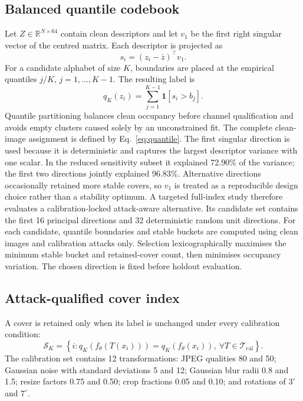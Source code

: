 ﻿\documentclass[a4paper,fleqn]{cas-dc}
\begin{document}
\subsection{Balanced quantile codebook}

Let $Z\in\mathbb{R}^{N\times64}$ contain clean descriptors and let $v_1$ be
the first right singular vector of the centred matrix. Each descriptor is
projected as
\begin{equation}
s_i=(z_i-\bar z)^\top v_1.
\end{equation}
For a candidate alphabet of size $K$, boundaries are placed at the empirical
quantiles $j/K$, $j=1,\ldots,K-1$. The resulting label is
\begin{equation}
q_K(z_i)=\sum_{j=1}^{K-1}\mathbf{1}[s_i>b_j].
\label{eq:quantile}
\end{equation}
Quantile partitioning balances clean occupancy before channel qualification
and avoids empty clusters caused solely by an unconstrained fit. The complete
clean-image assignment is defined by Eq.~\eqref{eq:quantile}.
The first singular direction is used because it is deterministic and captures
the largest descriptor variance with one scalar. In the reduced sensitivity
subset it explained 72.90\% of the variance; the first two directions jointly
explained 96.83\%. Alternative directions occasionally retained more stable
covers, so $v_1$ is treated as a reproducible design choice rather than a
stability optimum. A targeted full-index study therefore evaluates a
calibration-locked attack-aware alternative. Its candidate set contains the
first 16 principal directions and 32 deterministic random unit directions.
For each candidate, quantile boundaries and stable buckets are computed using
clean images and calibration attacks only. Selection lexicographically
maximises the minimum stable bucket and retained-cover count, then minimises
occupancy variation. The chosen direction is fixed before holdout evaluation.

\subsection{Attack-qualified cover index}

A cover is retained only when its label is unchanged under every calibration
condition:
\begin{equation}
\mathcal{S}_K=
\left\{i:q_K(f_\theta(T(x_i)))=q_K(f_\theta(x_i)),
\ \forall T\in\mathcal{T}_{\mathrm{cal}}\right\}.
\label{eq:stable}
\end{equation}
The calibration set contains 12 transformations: JPEG qualities 80 and 50;
Gaussian noise with standard deviations 5 and 12; Gaussian blur radii 0.8 and
1.5; resize factors 0.75 and 0.50; crop fractions 0.05 and 0.10; and rotations
of $3^\circ$ and $7^\circ$.
\end{document}
